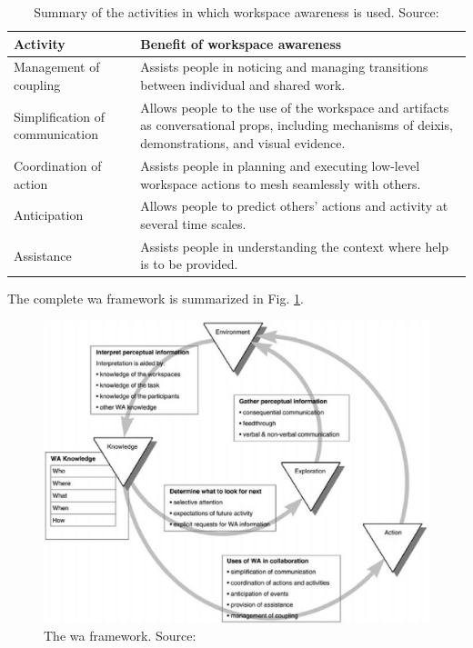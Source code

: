 \begin{table}[]
	\caption{Summary of the activities in which workspace awareness is used. Source: \parencite{gutwin_descriptive_2002}}
	\label{tab:summaryofactivitieswherwacanbeused}
	
	\begin{tabularx}{\linewidth}{lX}
		\hline
		Activity                        & Benefit of workspace awareness                                                                                                                        \\ \hline
		Management of coupling          & Assists people in noticing and managing transitions between individual and shared work.                                                               \\
		Simplification of communication & Allows people to the use of the workspace and artifacts as conversational props, including mechanisms of deixis, demonstrations, and visual evidence. \\
		Coordination of action          & Assists people in planning and executing low-level workspace actions to mesh seamlessly with others.                                                  \\
		Anticipation                    & Allows people to predict others’ actions and activity at several time scales.                                                                         \\
		Assistance                      & Assists people in understanding the context where help is to be provided.                                                                             \\ \hline
	\end{tabularx}
\end{table}


The complete \gls{wa} framework is summarized in Fig. \ref{fig:waframework}.

\begin{figure}
	\centering
	\includegraphics[width=0.7\linewidth]{figures/wa_framework}
	\caption{The \gls{wa} framework. Source: \parencite{gutwin_descriptive_2002}}
	\label{fig:waframework}
\end{figure}


